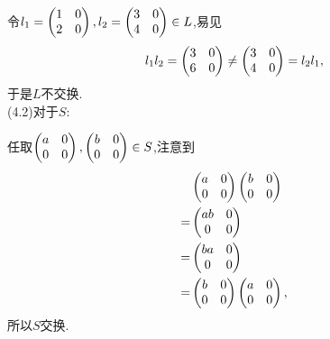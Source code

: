 \begin{solution}
    令$l_1=\left(\begin{matrix}
        1&0\\
        2&0
    \end{matrix}\right),l_2=\left(\begin{matrix}
        3&0\\
        4&0
    \end{matrix}\right)\in L$,易见\begin{align*}
        l_1l_2=\left(\begin{matrix}
            3&0\\
            6&0
        \end{matrix}\right)\neq\left(\begin{matrix}
            3&0\\
            4&0
        \end{matrix}\right)=l_2l_1,
    \end{align*}于是$L$不交换.\\(4.2)对于$S$:

    任取$\left(\begin{matrix}
        a&0\\
        0&0
    \end{matrix}\right),\left(\begin{matrix}
        b&0\\
        0&0
    \end{matrix}\right)\in S$,注意到\begin{align*}
        &\left(\begin{matrix}
            a&0\\
            0&0
        \end{matrix}\right)\left(\begin{matrix}
            b&0\\
            0&0
        \end{matrix}\right)\\
        =&\left(\begin{matrix}
            ab&0\\
            0&0
        \end{matrix}\right)\\
        =&\left(\begin{matrix}
            ba&0\\
            0&0
        \end{matrix}\right)\\
        =&\left(\begin{matrix}
            b&0\\
            0&0
        \end{matrix}\right)\left(\begin{matrix}
            a&0\\
            0&0
        \end{matrix}\right),
    \end{align*}所以$S$交换.
\end{solution}
